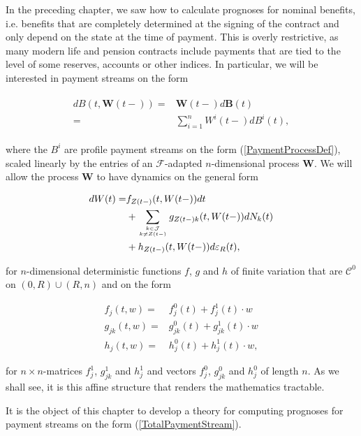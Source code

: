 \documentclass{book}
\newcommand{\1}[1]{\mathbbm{1}_{\left\lbrace #1 \right\rbrace}}
\theoremstyle{break}
\theoremstyle{remark}
\numberwithin{equation}{section}
\begin{document}
In the preceding chapter, we saw how to calculate prognoses for nominal benefits, i.e. benefits that are completely determined at the signing of the contract and only depend on the state at the time of payment. This is overly restrictive, as many modern life and pension contracts include payments that are tied to the level of some reserves, accounts or other indices. In particular, we will be interested in payment streams on the form

\begin{align} \label{TotalPaymentStream}
\begin{split}
	dB(t,\textbf{W}(t-)) =& \textbf{W}(t-) d\textbf{B}(t) \\
=& \sum_{i=1}^{n} W^i(t-) dB^i(t),
\end{split}
\end{align}

where the $B^i$ are profile payment streams on the form (\ref{PaymentProcessDef}), scaled linearly by the entries of an $\mathcal{F}$-adapted $n$-dimensional process $\textbf{W}$. We will allow the process $\textbf{W}$ to have dynamics on the general form

\begin{align} \label{WDynamicsStart}
	\begin{split}
		dW(t) =& f_{Z(t-)}(t,W(t-)) dt \\
		&+ \sum_{k \in \mathcal{J} \atop k \neq Z(t-)} g_{Z(t-)k}(t,W(t-)) dN_{k}(t) \\
		&+ h_{Z(t-)}(t,W(t-)) d \varepsilon_R(t),
	\end{split}
\end{align}

for $n$-dimensional deterministic functions $f$, $g$ and $h$ of finite variation that are $\mathcal{C}^0$ on $(0,R) \cup (R,n)$ and on the form

\begin{align*}
	f_j(t,w) =& f_j^0(t) + f_j^1(t) \cdot w \\
	g_{jk}(t,w) =& g_{jk}^0(t) + g_{jk}^1(t) \cdot w \\
	h_j(t,w) =& h_j^0(t) + h_j^1(t) \cdot w,
\end{align*}

for $n \times n$-matrices $f_j^1$, $g_{jk}^1$ and $ h_j^1$ and vectors $f_j^0$, $g_{jk}^0$ and $ h_j^0$ of length $n$. As we shall see, it is this affine structure that renders the mathematics tractable.



It is the object of this chapter to develop a theory for computing prognoses for payment streams on the form (\ref{TotalPaymentStream}).
\end{document}
